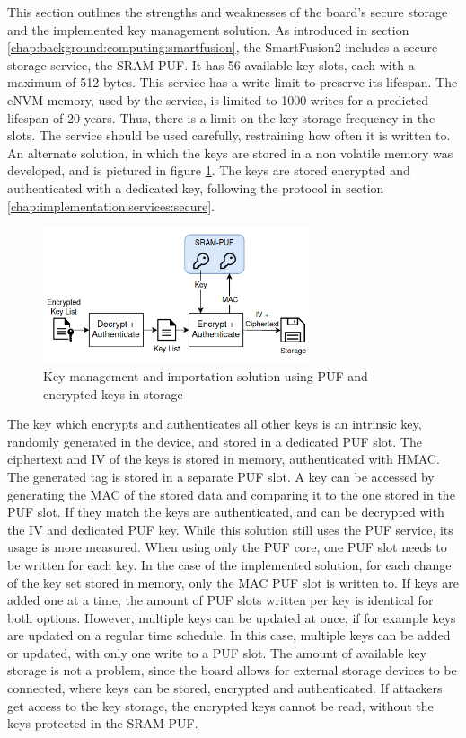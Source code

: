 This section outlines the strengths and weaknesses of the board's secure storage and the implemented key management solution. 
As introduced in section \ref{chap:background:computing:smartfusion}, the SmartFusion2 includes a secure storage service, the SRAM-PUF. It has 56 available key slots, each with a maximum of 512 bytes. This service has a write limit to preserve its lifespan. The eNVM memory, used by the service, is limited to 1000 writes for a predicted lifespan of 20 years. Thus, there is a limit on the key storage frequency in the slots. The service should be used carefully, restraining how often it is written to.
An alternate solution, in which the keys are stored in a non volatile memory was developed, and is pictured in figure \ref{fig:implementation:key-management}. The keys are stored encrypted and authenticated with a dedicated key, following the protocol in section \ref{chap:implementation:services:secure}.
\begin{figure}[h!]
	\centering
	\includegraphics[width=0.7\textwidth]{./Images/key-management.png}
	\caption{Key management and importation solution using PUF and encrypted keys in storage}
	\label{fig:implementation:key-management}
\end{figure}
The key which encrypts and authenticates all other keys is an intrinsic key, randomly generated in the device, and stored in a dedicated PUF slot. The ciphertext and IV of the keys is stored in memory, authenticated with HMAC. The generated tag is stored in a separate PUF slot.
A key can be accessed by generating the MAC of the stored data and comparing it to the one stored in the PUF slot. If they match the keys are authenticated, and can be decrypted with the IV and dedicated PUF key.
While this solution still uses the PUF service, its usage is more measured. When using only the PUF core, one PUF slot needs to be written for each key. In the case of the implemented solution, for each change of the key set stored in memory, only the MAC PUF slot is written to. If keys are added one at a time, the amount of PUF slots written per key is identical for both options. However, multiple keys can be updated at once, if for example keys are updated on a regular time schedule. In this case, multiple keys can be added or updated, with only one write to a PUF slot. The amount of available key storage is not a problem, since the board allows for external storage devices to be connected, where keys can be stored, encrypted and authenticated. If attackers get access to the key storage, the encrypted keys cannot be read, without the keys protected in the SRAM-PUF.
